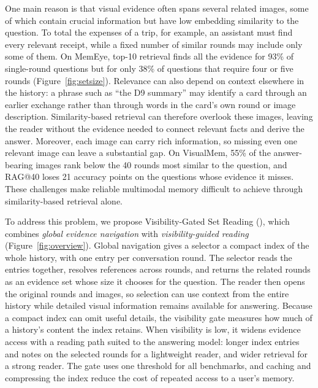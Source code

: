 One main reason is that visual evidence often spans several related images, some of which contain crucial information but have low embedding similarity to the question. To total the expenses of a trip, for example, an assistant must find every relevant receipt, while a fixed number of similar rounds may include only some of them. On MemEye, top-10 retrieval finds all the evidence for 93\% of single-round questions but for only 38\% of questions that require four or five rounds (Figure~\ref{fig:setsize}). Relevance can also depend on context elsewhere in the history: a phrase such as ``the D9 summary'' may identify a card through an earlier exchange rather than through words in the card's own round or image description. Similarity-based retrieval can therefore overlook these images, leaving the reader without the evidence needed to connect relevant facts and derive the answer. Moreover, each image can carry rich information, so missing even one relevant image can leave a substantial gap. On VisualMem, 55\% of the answer-bearing images rank below the 40 rounds most similar to the question, and RAG@40 loses 21 accuracy points on the questions whose evidence it misses. These challenges make reliable multimodal memory difficult to achieve through similarity-based retrieval alone.

To address this problem, we propose Visibility-Gated Set Reading (\vgs{}), which combines \emph{global evidence navigation} with \emph{visibility-guided reading} (Figure~\ref{fig:overview}). Global navigation gives a selector a compact index of the whole history, with one entry per conversation round. The selector reads the entries together, resolves references across rounds, and returns the related rounds as an evidence set whose size it chooses for the question. The reader then opens the original rounds and images, so selection can use context from the entire history while detailed visual information remains available for answering. Because a compact index can omit useful details, the visibility gate measures how much of a history's content the index retains. When visibility is low, it widens evidence access with a reading path suited to the answering model: longer index entries and notes on the selected rounds for a lightweight reader, and wider retrieval for a strong reader. The gate uses one threshold for all benchmarks, and caching and compressing the index reduce the cost of repeated access to a user's memory.

